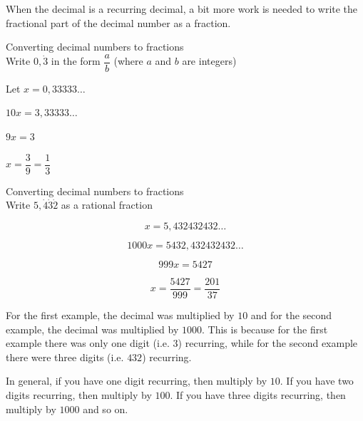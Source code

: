 \label{m38348*id63993}When the decimal is a recurring decimal, a bit more work is needed to write the fractional part of the decimal number as a fraction.\par 

\begin{wex}
{%
Converting decimal numbers to fractions
}
{%
\\
Write $0,\dot{3}$ in the form $\dfrac{a}{b}$ (where $a$ and $b$ are integers)
}
{%

Let $x = 0,33333\ldots$



$10x = 3,33333\ldots$



$9x = 3 $


$ x = \dfrac{3}{9} = \dfrac{1}{3} $
}
\end{wex}


\begin{wex}
{%
Converting decimal numbers to fractions
}
{%
\\Write $5,\dot{4}\dot{3}\dot{2}$ as a rational fraction
}
{%


$$ x = 5,432432432\ldots $$


$$ 1000x = 5432,432432432\ldots $$


$$ 999x = 5427 $$


$$ x = \dfrac{5427}{999} = \dfrac{201}{37} $$

}
\end{wex}




\label{m38348*id64459}For the first example, the decimal was multiplied by $10$ and for the second example, the decimal was multiplied by $1000$. This is because for the first example there was only one digit (i.e. $3$) recurring, while for the second example there were three digits (i.e. $432$) recurring.\par 
\label{m38348*id64465}In general, if you have one digit recurring, then multiply by $10$. If you have two digits recurring, then multiply by $100$. If you have three digits recurring, then multiply by $1000$ and so on.\par

